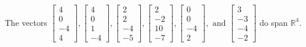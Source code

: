 \begin{exercise}
\begin{exerciseStatement}
  \end{exerciseStatement}
  \begin{exerciseAnswer}
   The vectors \(\left[\begin{array}{r}
4 \\
0 \\
-4 \\
4
\end{array}\right] , \left[\begin{array}{r}
4 \\
0 \\
1 \\
-4
\end{array}\right] , \left[\begin{array}{r}
2 \\
2 \\
-4 \\
-5
\end{array}\right] , \left[\begin{array}{r}
2 \\
-2 \\
10 \\
-7
\end{array}\right] , \left[\begin{array}{r}
0 \\
0 \\
-4 \\
2
\end{array}\right] , \text{ and } \left[\begin{array}{r}
3 \\
-3 \\
-4 \\
-2
\end{array}\right]\) 
  	 do  
	span \(\mathbb{R}^4\).
  


  \end{exerciseAnswer}
\end{exercise}